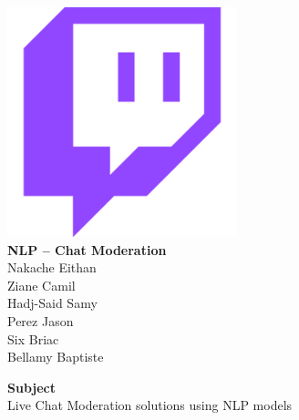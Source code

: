 \begin{titlepage} 
    \begin{center}
     \vspace*{\fill}  %
        \includegraphics[width=0.5\textwidth]{figures/twitch.png}\\
        \vspace{2cm}
        \textbf{\Large NLP – Chat Moderation}\\    
        \vspace{2cm}
        Nakache Eithan \\
        Ziane Camil \\
        Hadj-Said Samy \\
        Perez Jason \\
        Six Briac \\
        Bellamy Baptiste
        \vspace{2cm} 
     \vspace*{\fill}  %
             
 \textbf{Subject}\\
    Live Chat Moderation solutions using NLP models\\
    \end{center}

\end{titlepage}